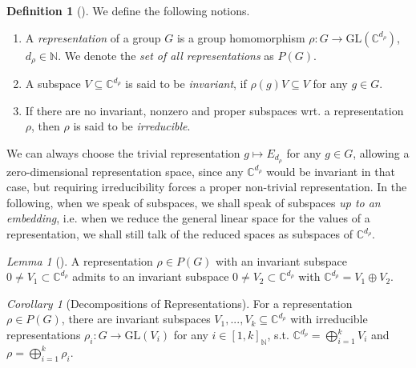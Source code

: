 \documentclass[10pt]{amsart}
\theoremstyle{definition}
\newtheorem{definition}{Definition}
\theoremstyle{remark}
\newtheorem{lemma}[theorem]{Lemma}
\newtheorem{corollary}[theorem]{Corollary}
\begin{document}
    \begin{definition}[{\cite[pp. 25-26]{Lomont2004}}]
        We define the following notions.
        \begin{enumerate}[label=(\roman*), wide]
            \item A \emph{representation} of a group \(G\) is a group homomorphism \(\rho\colon G \to \text{GL}(\mathbb{C}^{d_\rho})\), \(d_\rho \in \mathbb{N}\). We denote the \emph{set of all representations} as \(P(G)\).
            \item A subspace \(V \subseteq \mathbb{C}^{d_\rho}\) is said to be \emph{invariant}, if \(\rho(g)V \subseteq V\) for any \(g \in G\).
            \item If there are no invariant, nonzero and proper subspaces wrt. a representation \(\rho\), then \(\rho\) is said to be \emph{irreducible}.
        \end{enumerate}
    \end{definition}

    We can always choose the trivial representation \(g \mapsto E_{d_\rho}\) for any \(g \in G\), allowing a zero-dimensional representation space, since any \(\mathbb{C}^{d_\rho}\) would be invariant in that case, but requiring irreducibility forces a proper non-trivial representation. In the following, when we speak of subspaces, we shall speak of subspaces \emph{up to an embedding}, i.e. when we reduce the general linear space for the values of a representation, we shall still talk of the reduced spaces as subspaces of \(\mathbb{C}^{d_\rho}\).

    \begin{lemma}[{\cite[p. 6]{Fulton}}] \label{characteristics_decomposition_lemma}
        A representation \(\rho \in P(G)\) with an invariant subspace \(0 \neq V_1 \subset \mathbb{C}^{d_\rho}\) admits to an invariant subspace \(0 \neq V_2 \subset \mathbb{C}^{d_\rho}\) with \(\mathbb{C}^{d_\rho} = V_1 \oplus V_2\).
    \end{lemma}

    \begin{corollary}[Decompositions of Representations]
        For a representation \(\rho \in P(G)\), there are invariant subspaces \(V_1, ..., V_k \subseteq \mathbb{C}^{d_\rho}\) with irreducible representations \(\rho_i\colon G \to \text{GL}(V_i)\) for any \(i \in [1, k]_{\mathbb{N}}\), s.t. \(\mathbb{C}^{d_\rho} = \bigoplus_{i=1}^k V_i\) and \(\rho = \bigoplus_{i=1}^k \rho_i\).
    \end{corollary}
\end{document}
